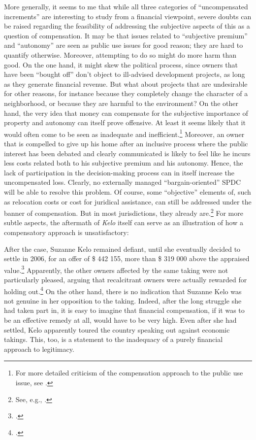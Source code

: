 \documentclass[12pt,a4paper]{book} %
\begin{document}
More generally, it seems to me that while all three categories of ``uncompensated increments'' are interesting to study from a financial viewpoint, severe doubts can be raised regarding the feasibility of addressing the subjective aspects of this as a question of compensation. It may be that issues related to ``subjective premium'' and ``autonomy'' are seen as public use issues for good reason; they are hard to quantify otherwise. Moreover, attempting to do so might do more harm than good. On the one hand, it might skew the political process, since owners that have been ``bought off'' don't object to ill-advised development projects, as long as they generate financial revenue. But what about projects that are undesirable for other reasons, for instance because they completely change the character of a neighborhood, or because they are harmful to the environment? On the other hand, the very idea that money can compensate for the subjective importance of property and autonomy can itself prove offensive. At least it seems likely that it would often come to be seen as inadequate and inefficient.\footnote{For more detailed criticism of the compensation approach to the public use issue, see \cite{garnett06}.} Moreover, an owner that is compelled to give up his home after an inclusive process where the public interest has been debated and clearly communicated is likely to feel like he incurs less costs related both to his subjective premium and his autonomy. Hence, the lack of participation in the decision-making process can in itself increase the uncompensated loss. Clearly, no externally managed ``bargain-oriented'' SPDC will be able to resolve this problem. Of course, some ``objective'' elements of, such as relocation costs or cost for juridical assistance, can still be addressed under the banner of compensation. But in most jurisdictions, they already are.\footnote{See, e.g., \cite[121-126]{garnett06}.} For more subtle aspects, the aftermath of {\it Kelo} itself can serve as an illustration of how a compensatory approach is unsatisfactory:

After the case, Suzanne Kelo remained defiant, until she eventually decided to settle in 2006, for an offer of \$ 442 155, more than \$ 319 000 above the appraised value.\footcite[1709]{lehavi07} Apparently, the other owners affected by the same taking were not particularly pleased, arguing that recalcitrant owners were actually rewarded for holding out.\footcite[1709]{lehavi07} On the other hand, there is no indication that Suzanne Kelo was not genuine in her opposition to the taking. Indeed, after the long struggle she had taken part in, it is easy to imagine that financial compensation, if it was to be an effective remedy at all, would have to be very high. Even after she had settled, Kelo apparently toured the country speaking out against economic takings. This, too, is a statement to the inadequacy of a purely financial approach to legitimacy. 
\end{document}
